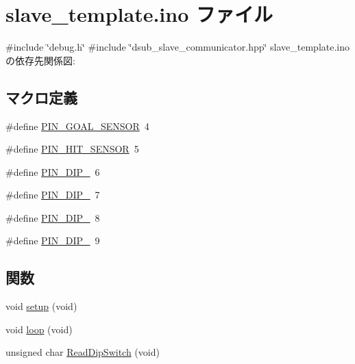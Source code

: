 \hypertarget{slave__template_8ino}{}\section{slave\+\_\+template.\+ino ファイル}
\label{slave__template_8ino}
{\ttfamily \#include \char`\"{}debug.\+h\char`\"{}}\newline
{\ttfamily \#include \char`\"{}dsub\+\_\+slave\+\_\+communicator.\+hpp\char`\"{}}\newline
slave\+\_\+template.\+ino の依存先関係図\+:
\subsection*{マクロ定義}
\begin{DoxyCompactItemize}
\item 
\#define \mbox{\hyperlink{slave__template_8ino_a04bd3af8e0d78c7fb2a066085fb8ed19}{P\+I\+N\+\_\+\+G\+O\+A\+L\+\_\+\+S\+E\+N\+S\+OR}}~4
\item 
\#define \mbox{\hyperlink{slave__template_8ino_a4d3004c75c745c0b097de0dfea5e52de}{P\+I\+N\+\_\+\+H\+I\+T\+\_\+\+S\+E\+N\+S\+OR}}~5
\item 
\#define \mbox{\hyperlink{slave__template_8ino_a1865ea46eaf057c61c9661e6777e617b}{P\+I\+N\+\_\+\+D\+I\+P\+\_}}~6
\item 
\#define \mbox{\hyperlink{slave__template_8ino_aad6f8823636ffe5bee61d57219a18f53}{P\+I\+N\+\_\+\+D\+I\+P\+\_}}~7
\item 
\#define \mbox{\hyperlink{slave__template_8ino_af0b38ba5f8b9c96b3a1f03b00382739c}{P\+I\+N\+\_\+\+D\+I\+P\+\_}}~8
\item 
\#define \mbox{\hyperlink{slave__template_8ino_a2d393a9dffb71739bd6aa98a0eb94e76}{P\+I\+N\+\_\+\+D\+I\+P\+\_}}~9
\end{DoxyCompactItemize}
\subsection*{関数}
\begin{DoxyCompactItemize}
\item 
void \mbox{\hyperlink{slave__template_8ino_a7dfd9b79bc5a37d7df40207afbc5431f}{setup}} (void)
\item 
void \mbox{\hyperlink{slave__template_8ino_a0b33edabd7f1c4e4a0bf32c67269be2f}{loop}} (void)
\item 
unsigned char \mbox{\hyperlink{slave__template_8ino_a77b0a767d95108a48a54b857588d2863}{Read\+Dip\+Switch}} (void)
\end{DoxyCompactItemize}
